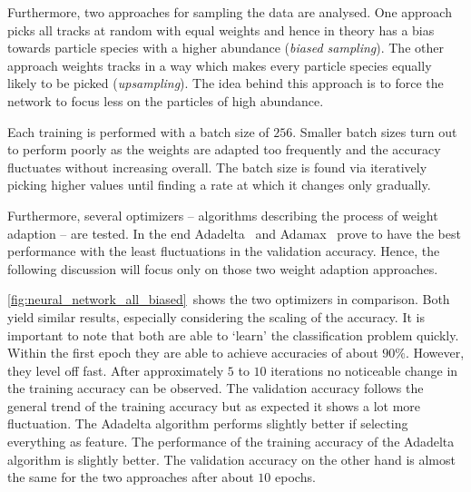Furthermore, two approaches for sampling the data are analysed. One approach picks all tracks at random with equal weights and hence in theory has a bias towards particle species with a higher abundance (\textit{biased sampling}). The other approach weights tracks in a way which makes every particle species equally likely to be picked (\textit{upsampling}). The idea behind this approach is to force the network to focus less on the particles of high abundance.

Each training is performed with a batch size of $256$. Smaller batch sizes turn out to perform poorly as the weights are adapted too frequently and the accuracy fluctuates without increasing overall. The batch size is found via iteratively picking higher values until finding a rate at which it changes only gradually.

Furthermore, several optimizers -- algorithms describing the process of weight adaption -- are tested. In the end Adadelta~\cite{DBLP:journals/corr/abs-1212-5701} and Adamax~\cite{DBLP:journals/corr/KingmaB14} prove to have the best performance with the least fluctuations in the validation accuracy. Hence, the following discussion will focus only on those two weight adaption approaches.

\autoref{fig:neural_network_all_biased}~shows the two optimizers in comparison. Both yield similar results, especially considering the scaling of the accuracy. It is important to note that both are able to `learn' the classification problem quickly. Within the first epoch they are able to achieve accuracies of about $90\%$. However, they level off fast. After approximately $5$ to $10$ iterations no noticeable change in the training accuracy can be observed. The validation accuracy follows the general trend of the training accuracy but as expected it shows a lot more fluctuation. The Adadelta algorithm performs slightly better if selecting everything as feature. The performance of the training accuracy of the Adadelta algorithm is slightly better. The validation accuracy on the other hand is almost the same for the two approaches after about $10$ epochs.

